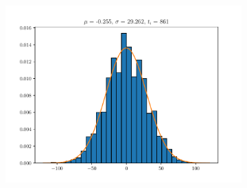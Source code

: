 \documentclass{article}
\begin{document}
\begin{figure}
\begin{subfigure}{.3\textwidth}
  \includegraphics[width=1.1\linewidth]{hist9.pdf}
\end{subfigure}
\newline


\end{figure}
\end{document}
